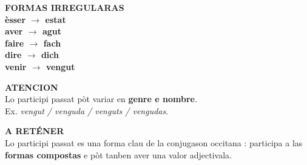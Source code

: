 \documentclass[a4paper,11pt]{article}
\begin{document}
\begin{minipage}{.91\textwidth}
\vspace{2mm}
\begin{minipage}{.485\textwidth}\begin{neutralbox}[height=3.15cm]
\textbf{\color{NeutralDark}FORMAS IRREGULARAS}\\[1mm]
\centering
\textbf{èsser $\rightarrow$ estat}\\
\textbf{aver $\rightarrow$ agut}\\
\textbf{faire $\rightarrow$ fach}\\
\textbf{dire $\rightarrow$ dich}\\
\textbf{venir $\rightarrow$ vengut}
\end{neutralbox}\end{minipage}\hfill
\begin{minipage}{.485\textwidth}\begin{warnbox}[height=3.15cm]
\textbf{\color{Red}ATENCION}\\[1mm]
Lo participi passat pòt variar en \textbf{genre e nombre}.\\[1mm]
Ex. \textit{vengut / venguda / venguts / vengudas}.
\end{warnbox}\end{minipage}
\vspace{2mm}\begin{neutralbox}\textbf{\color{NeutralDark}A RETÉNER}\\[1mm]
Lo participi passat es una forma clau de la conjugason occitana : participa a las \textbf{formas compostas}
e pòt tanben aver una valor adjectivala.
\end{neutralbox}
\vspace{1.5mm}
\end{minipage}
\end{document}
